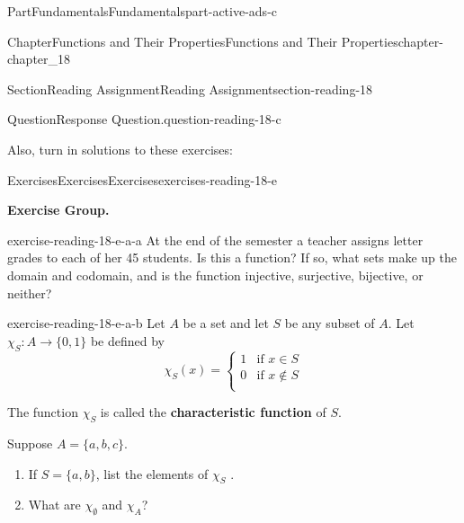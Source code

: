 \documentclass[oneside,10pt,]{book}
\newcommand{\terminology}[1]{\textbf{#1}}
\numberwithin{equation}{section}
\begin{document}
\begin{partptx}{Part}{Fundamentals}{}{Fundamentals}{}{}{part-active-ads-c}
\begin{chapterptx}{Chapter}{Functions and Their Properties}{}{Functions and Their Properties}{}{}{chapter-chapter_18}
\begin{sectionptx}{Section}{Reading Assignment}{}{Reading Assignment}{}{}{section-reading-18}
\begin{question}{Question}{Response Question.}{question-reading-18-c}
\end{question}
Also, turn in solutions to these exercises:%
%
%
\typeout{************************************************}
\typeout{************************************************}
%
\begin{exercises-subsection-numberless}{Exercises}{Exercises}{}{Exercises}{}{}{exercises-reading-18-e}
\par\medskip\noindent%
\textbf{Exercise Group.}\space\space%
\begin{exercisegroup}
\begin{divisionexerciseeg}{1}{}{}{exercise-reading-18-e-a-a}%
At the end of the semester a teacher assigns letter grades to each of her 45 students. Is this a function? If so, what sets make up the domain and codomain, and is the function injective, surjective, bijective, or neither?%
\end{divisionexerciseeg}%
\begin{divisionexerciseeg}{2}{}{}{exercise-reading-18-e-a-b}%
Let \(A\) be a set and let \(S\) be any subset of \(A\). Let \(\chi_S: A\to \{0,1\}\) be defined by%
\begin{equation*}
\chi_S(x)= \left\{
\begin{array}{cc}
1 & \textrm{if } x\in S \\
0 & \textrm{if } x\notin S \\
\end{array}
\right.
\end{equation*}
%
\par
The function \(\chi_S\) is called the \terminology{characteristic function} of \(S\).%
\par
Suppose \(A = \{a, b, c\}\).%
\begin{enumerate}[label=(\alph*)]
\item{}If  \(S = \{a, b\}\), list the elements of \(\chi_S\) .%
\item{}What are \(\chi_{\emptyset}\) and \(\chi_A\)?%
\end{enumerate}
%
\end{divisionexerciseeg}%
\end{exercisegroup}
\par\medskip\noindent
\end{exercises-subsection-numberless}
\end{sectionptx}
%
%
\typeout{************************************************}
\typeout{************************************************}

\end{chapterptx}
\end{partptx}
\end{document}
